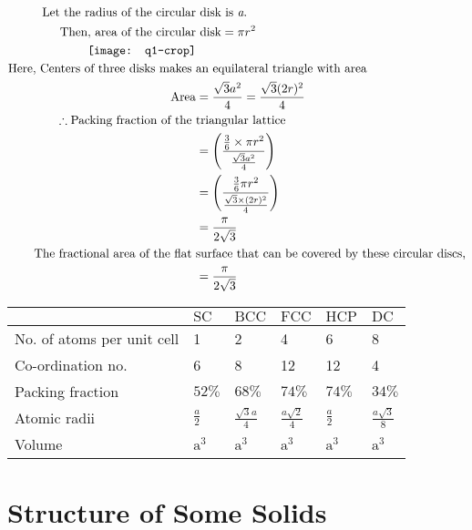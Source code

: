 \begin{answer}
	\begin{align*}
	\text{	Let the radius of the circular}&\text{ disk is \textit{a}.}\\
	\text{Then, area of the circular}&\text{ disk}= \pi r^{2}\\
	\texttt{[image: q1-crop]}\\
	\text{Here, Centers of three disks makes }&\text{an equilateral triangle with area}\\
	\text{Area}&= \frac{\sqrt{3}a^{2}}{4} = \frac{\sqrt{3}(2r)^{2}}{4}\\
	\therefore \text{Packing fraction of the }&\text{triangular lattice}\\
	&= \left( \frac{\frac{3}{6} \times \pi r^{2}}{\frac{\sqrt{3}a^{2}}{4}}\right) \\
	&= \left( \frac{\frac{3}{6} \pi r^{2}}{\frac{\sqrt{3}\times (2r)^{2}}{4}}\right) \\
	&=\frac{\pi}{2 \sqrt{3}}\\
	 \text{The fractional area of the flat }&\text{surface that can be covered by these circular discs,}\\
	 &=\frac{\pi}{2 \sqrt{3}}
	\end{align*}
\end{answer}
\setlength\arrayrulewidth{1pt}
\begin{table}[H]
	\centering
	\renewcommand{\arraystretch}{1.5}
	\begin{tabular}{|l|l|l|l|l|l|}
		\hline & $\mathrm{SC}$ & $\mathrm{BCC}$ & $\mathrm{FCC}$ & $\mathrm{HCP}$ & $\mathrm{DC}$ \\
		\hline No. of atoms per unit cell & 1 & 2 & 4 & 6 & 8 \\
		\hline Co-ordination no. & 6 & 8 & 12 & 12 & 4 \\
		\hline Packing fraction & $52 \%$ & $68 \%$ & $74 \%$ & $74 \%$ & $34 \%$ \\
		\hline Atomic radii & $\frac{a}{2}$ & $\frac{\sqrt{3} a}{4}$ & $\frac{a \sqrt{2}}{4}$ & $\frac{a}{2}$ & $\frac{a \sqrt{3}}{8}$ \\
		\hline Volume & $\mathrm{a}^{3}$ & $\mathrm{a}^{3}$ & $\mathrm{a}^{3}$ & $\mathrm{a}^{3}$ & $\mathrm{a}^{3}$ \\
		\hline
	\end{tabular}
\end{table}
\section{Structure of Some Solids}
